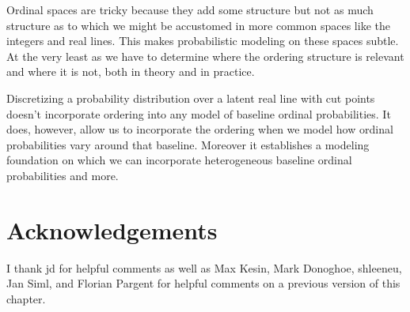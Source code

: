 \documentclass[
  letterpaper,
  DIV=11,
  numbers=noendperiod]{scrartcl}
\begin{document}
Ordinal spaces are tricky because they add some structure but not as
much structure as to which we might be accustomed in more common spaces
like the integers and real lines. This makes probabilistic modeling on
these spaces subtle. At the very least as we have to determine where the
ordering structure is relevant and where it is not, both in theory and
in practice.

Discretizing a probability distribution over a latent real line with cut
points doesn't incorporate ordering into any model of baseline ordinal
probabilities. It does, however, allow us to incorporate the ordering
when we model how ordinal probabilities vary around that baseline.
Moreover it establishes a modeling foundation on which we can
incorporate heterogeneous baseline ordinal probabilities and more.

\section*{Acknowledgements}\label{acknowledgements}

I thank jd for helpful comments as well as Max Kesin, Mark Donoghoe,
shleeneu, Jan Siml, and Florian Pargent for helpful comments on a
previous version of this chapter.
\end{document}
